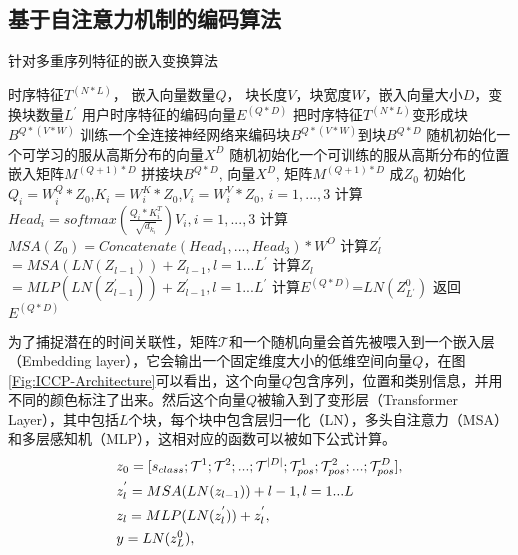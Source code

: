 \subsection{基于自注意力机制的编码算法}
\begin{algorithm}
	\caption{针对多重序列特征的嵌入变换算法}
	\label{ALG:Transformer-Encoding}
	\renewcommand{\algorithmicrequire}{\textbf{Input:}}
	\renewcommand{\algorithmicensure}{\textbf{Output:}}
	
	\begin{algorithmic}[1]
		\REQUIRE 时序特征$T^{(N*L)}$， 嵌入向量数量$Q$， 块长度$V$，块宽度$W$，嵌入向量大小$D$，变换块数量$L^\prime$
		\ENSURE 用户时序特征的编码向量$E^{(Q*D)}$
		\STATE 把时序特征$T^{(N*L)}$变形成块$B^{Q*(V*W)}$
		\STATE 训练一个全连接神经网络来编码块$B^{Q*(V*W)}$到块$B^{Q*D}$
		\STATE 随机初始化一个可学习的服从高斯分布的向量$X^D$   %
		\STATE 随机初始化一个可训练的服从高斯分布的位置嵌入矩阵$M^{(Q+1)*D}$ %
		\STATE 拼接块$B^{Q*D}$, 向量$X^D$, 矩阵$M^{(Q+1)*D}$ 成$Z_0$  %
		\STATE 初始化$Q_i=W^Q_i*Z_0$,$K_i=W^K_i*Z_0$,$V_i=W^V_i*Z_0$, $i=1,...,3$
		\STATE 计算$Head_i=softmax(\frac{Q_i*K^T_i}{\sqrt{d_{k_i}}})V_i,i=1,...,3$
		\STATE 计算$MSA(Z_0)=Concatenate(Head_1,...,Head_3)*W^O$
		\STATE 计算$Z^\prime_l$ $=MSA(LN(Z_{l-1}))+Z_{l-1},l=1...L^\prime$
		\STATE 计算$Z_l$ $=MLP(LN(Z_{l-1}^\prime))+Z_{l-1}^\prime,l=1...L^\prime$
		\STATE 计算$E^{(Q*D)}$=$LN(Z^0_{L{^\prime}})$
		\STATE 返回$E^{(Q*D)}$		
		
	\end{algorithmic}
\end{algorithm}
为了捕捉潜在的时间关联性，矩阵$\mathcal{T}$和一个随机向量会首先被喂入到一个嵌入层（Embedding layer），它会输出一个固定维度大小的低维空间向量$Q$，在图\ref{Fig:ICCP-Architecture}可以看出，这个向量$Q$包含序列，位置和类别信息，并用不同的颜色标注了出来。然后这个向量$Q$被输入到了变形层（Transformer Layer），其中包括$L$个块，每个块中包含层归一化（LN），多头自注意力（MSA）和多层感知机（MLP），这相对应的函数可以被如下公式计算。
\begin{subequations}\label{Eq.(3-4)}
	\renewcommand{\theequation}{\theparentequation-\alph{equation}} %
	\begin{align}
		&z_{0} = [s_{class}; \mathcal{T}^{1}; \mathcal{T}^{2}; ... ; \mathcal{T}^{\lvert D \rvert}; \mathcal{T}^{1}_{pos}; \mathcal{T}^{2}_{pos}; ...; \mathcal{T}^{D}_{pos} ], \label{Eq.(a)} \\
		&z_{l}^{'} = MSA(LN(z_{l-1})) + l-1, l=1...L \label{Eq.(b)} \\
		&z_{l} = MLP(LN(z_{l}^{'}))+z_{l}^{'}, \label{Eq.(c)} \\
		&y = LN(z_{L}^{0}), \label{Eq.(d)} 
	\end{align}
	\label{Eq:Transformer}
\end{subequations}
